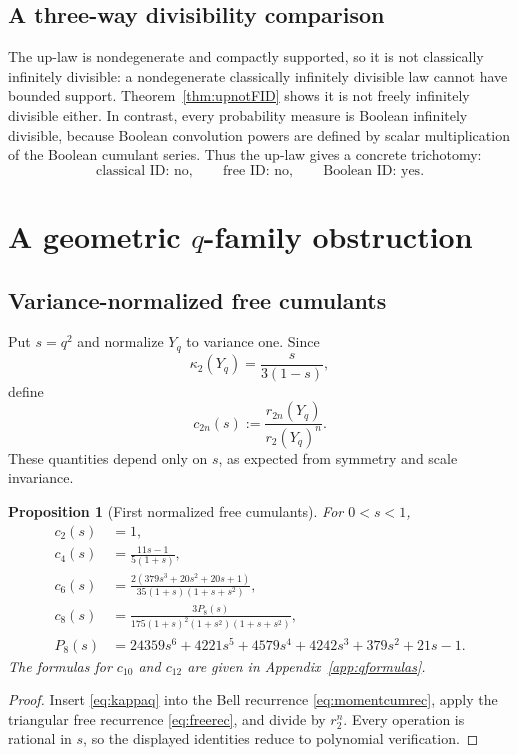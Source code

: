\documentclass[11pt]{article}
\newtheorem{proposition}[theorem]{Proposition}
\theoremstyle{definition}
\begin{document}
\subsection{A three-way divisibility comparison}
The up-law is nondegenerate and compactly supported, so it is not classically infinitely divisible: a nondegenerate classically infinitely divisible law cannot have bounded support. Theorem~\ref{thm:upnotFID} shows it is not freely infinitely divisible either. In contrast, every probability measure is Boolean infinitely divisible, because Boolean convolution powers are defined by scalar multiplication of the Boolean cumulant series. Thus the up-law gives a concrete trichotomy:
\[
\text{classical ID: no},\qquad \text{free ID: no},\qquad \text{Boolean ID: yes}.
\]

\section{A geometric \texorpdfstring{\(q\)}{q}-family obstruction}
\subsection{Variance-normalized free cumulants}
Put \(s=q^2\) and normalize \(Y_q\) to variance one. Since
\[
\kappa_2(Y_q)=\frac{s}{3(1-s)},
\]
define
\[
c_{2n}(s):=\frac{r_{2n}(Y_q)}{r_2(Y_q)^n}.
\]
These quantities depend only on \(s\), as expected from symmetry and scale invariance.

\begin{proposition}[First normalized free cumulants]\label{prop:qfree}
For \(0<s<1\),
\begin{align}
c_2(s)&=1,\label{eq:c2s}\\
c_4(s)&=\frac{11s-1}{5(1+s)},\label{eq:c4s}\\
c_6(s)&=\frac{2(379s^3+20s^2+20s+1)}{35(1+s)(1+s+s^2)},\label{eq:c6s}\\
c_8(s)&=\frac{3P_8(s)}{175(1+s)^2(1+s^2)(1+s+s^2)},\label{eq:c8s}\\
P_8(s)&=24359s^6+4221s^5+4579s^4+4242s^3+379s^2+21s-1.\nonumber
\end{align}
The formulas for \(c_{10}\) and \(c_{12}\) are given in Appendix~\ref{app:qformulas}.
\end{proposition}
\begin{proof}
Insert \eqref{eq:kappaq} into the Bell recurrence \eqref{eq:momentcumrec}, apply the triangular free recurrence \eqref{eq:freerec}, and divide by \(r_2^n\). Every operation is rational in \(s\), so the displayed identities reduce to polynomial verification.
\end{proof}
\end{document}
